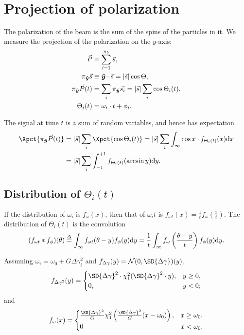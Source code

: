 \documentclass{article}
\newcommand{\nb}{{n_b}}
\newcommand{\uvec}[1]{\boldsymbol{\hat{#1}}}
\newcommand{\abs}[1]{\vert#1\vert}
\newcommand{\proj}[2]{\pi_{\uvec{#2}}\vec{#1}}
\newcommand{\deq}{\overset{\Delta}{=}}
\newcommand{\Norm}{\mathcal{N}}
\begin{document}
\section{Projection of polarization}
The polarization of the beam is the sum of the spins of the particles in it. We measure the projection of the polarization on the $y$-axis:
\begin{align}
	\vec{P} &= \sum_{i=1}^\nb \vec{s}, \notag\\
	\proj{s}{y} &\equiv \uvec{y}\cdot\vec{s} = \abs{\vec{s}}\cos\Theta, \notag\\
	\proj{P}{y}(t) &= \sum_i \proj{s_i}{y} = \abs{\vec{s}}\sum_i \cos\Theta_i(t), \label{eq:SumSpins}\\
	\Theta_i(t) &= \omega_i\cdot t + \phi_i.\notag
\end{align}

The signal at time $t$ is a sum of random variables, and hence has expectation 
\begin{align*}
	\Xpct{\proj{P}{y}(t)} &= \abs{\vec{s}}\sum_i\Xpct{\cos\Theta_i(t)} = \abs{\vec{s}}\sum_i\int_{\infty}\cos x \cdot f_{\Theta_i(t)}(x)\td x \\
	&= \abs{\vec{s}}\sum_i\int_{-1}^{+1} f_{\Theta_i(t)}(\arcsin y)\td y.
\end{align*}

\subsection{Distribution of $\Theta_i(t)$}
\newcommand{\f}[1]{f_{#1}}
\newcommand{\fw}{\f{\omega}}
\newcommand{\fp}{\f{\phi}}
\newcommand{\fwt}{\f{\omega t}}
\newcommand{\ftht}{\f{\Theta(t)}}

\newcommand{\wycoef}{G}
\newcommand{\dy}{\Delta\gamma}

If the distribution of $\omega_i$ is $\fw(x)$, then that of $\omega_i t$ is $\fwt(x) = \frac{1}{t}\fw(\frac{x}{t})$. The distribution of $\Theta_i(t)$ is the convolution 
\[
	(\fwt*\fp)(\theta) \deq \int_\infty \fwt(\theta-y)\fp(y)\td y = \frac1t \int_\infty \fw\bkt{\frac{\theta-y}{t}}\fp(y)\td y.
\]

Assuming $\omega_i = \omega_0 + \wycoef\dy_i^2$ and $f_{\dy}(y)=\Norm(0, \SD{\dy})(y)$, 
\begin{equation*}
	f_{\dy^2}(y) =\begin{cases}
		\SD{\dy}^2 \cdot\chi^2_1(\SD{\dy}^2\cdot y), & y \geq 0,\\
		0, & y < 0;
	\end{cases}
\end{equation*}
and
\begin{equation*}
	\fw(x) =\begin{cases}
		 \frac{\SD{\dy}^2}{\wycoef}\chi_1^2\bkt{\frac{\SD{\dy}^2}{\wycoef}(x-\omega_0)}, & x\geq \omega_0,\\
		 0 & x < \omega_0.
	\end{cases}
\end{equation*} 
\end{document}

